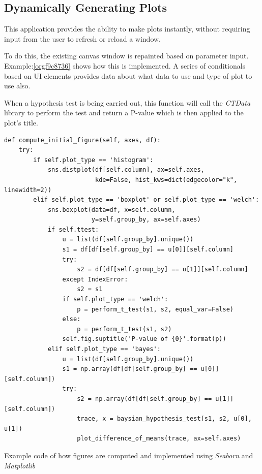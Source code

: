 \documentclass[11pt]{report}
\begin{document}
\subsection{Dynamically Generating Plots}
\label{sec:orga768ce7}
This application provides the ability to make plots instantly, without requiring input from the user to refresh or reload a window.

To do this, the existing canvas window is repainted based on parameter input. Example:\ref{orgf9c8736}
shows how this is implemented. A series of conditionals based on UI elements provides data about what data to use and type of plot to use also.

When a hypothesis test is being carried out, this function will call the \emph{CTData} library to perform the test and return a P-value which is then applied to the plot's title.

\begin{listing}[htbp]
\begin{verbatim}
def compute_initial_figure(self, axes, df):
    try:
        if self.plot_type == 'histogram':
            sns.distplot(df[self.column], ax=self.axes,
                         kde=False, hist_kws=dict(edgecolor="k", linewidth=2))
        elif self.plot_type == 'boxplot' or self.plot_type == 'welch':
            sns.boxplot(data=df, x=self.column,
                        y=self.group_by, ax=self.axes)
            if self.ttest:
                u = list(df[self.group_by].unique())
                s1 = df[df[self.group_by] == u[0]][self.column]
                try:
                    s2 = df[df[self.group_by] == u[1]][self.column]
                except IndexError:
                    s2 = s1
                if self.plot_type == 'welch':
                    p = perform_t_test(s1, s2, equal_var=False)
                else:
                    p = perform_t_test(s1, s2)
                self.fig.suptitle('P-value of {0}'.format(p))
            elif self.plot_type == 'bayes':
                u = list(df[self.group_by].unique())
                s1 = np.array(df[df[self.group_by] == u[0]][self.column])
                try:
                    s2 = np.array(df[df[self.group_by] == u[1]][self.column])
                    trace, x = baysian_hypothesis_test(s1, s2, u[0], u[1])
                    plot_difference_of_means(trace, ax=self.axes)
\end{verbatim}
\caption{\label{orgf9c8736}
Example code of how figures are computed and implemented using \emph{Seaborn} and \emph{Matplotlib}}
\end{listing}
\end{document}
